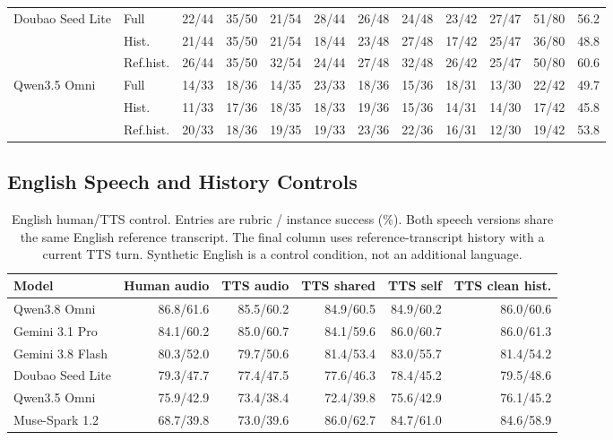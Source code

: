 \begin{table}[htbp]
\begin{tabular*}{\linewidth}{@{}l@{\hspace{5pt}}l@{\extracolsep{\fill}}*{9}{r}r@{}}
Doubao Seed Lite & Full & 22/44 & 35/50 & 21/54 & 28/44 & 26/48 & 24/48 & 23/42 & 27/47 & 51/80 & 56.2 \\
 & Hist. & 21/44 & 35/50 & 21/54 & 18/44 & 23/48 & 27/48 & 17/42 & 25/47 & 36/80 & 48.8 \\
 & Ref.hist. & 26/44 & 35/50 & 32/54 & 24/44 & 27/48 & 32/48 & 26/42 & 25/47 & 50/80 & 60.6 \\
Qwen3.5 Omni & Full & 14/33 & 18/36 & 14/35 & 23/33 & 18/36 & 15/36 & 18/31 & 13/30 & 22/42 & 49.7 \\
 & Hist. & 11/33 & 17/36 & 18/35 & 18/33 & 19/36 & 15/36 & 14/31 & 14/30 & 17/42 & 45.8 \\
 & Ref.hist. & 20/33 & 18/36 & 19/35 & 19/33 & 23/36 & 22/36 & 16/31 & 12/30 & 19/42 & 53.8 \\
\bottomrule
\end{tabular*}
\endgroup
\end{table}


\subsection{English Speech and History Controls}

\label{app:history_controls}

\begin{table}[htbp]
\centering
\caption{English human/TTS control. Entries are rubric / instance success (\%). Both speech versions share the same English reference transcript. The final column uses reference-transcript history with a current TTS turn. Synthetic English is a control condition, not an additional language.}
\label{tab:english_control}
\begingroup
\fontsize{8.5}{10.2}\selectfont
\setlength{\tabcolsep}{1pt}
\renewcommand{\arraystretch}{1.06}
\begin{tabular*}{\linewidth}{@{}l@{\extracolsep{\fill}}rrrrr@{}}
\toprule
\textbf{Model} & \textbf{Human audio} & \textbf{TTS audio} & \textbf{TTS shared} & \textbf{TTS self} & \textbf{TTS clean hist.} \\
\midrule
Qwen3.8 Omni & 86.8/61.6 & 85.5/60.2 & 84.9/60.5 & 84.9/60.2 & 86.0/60.6 \\
Gemini 3.1 Pro & 84.1/60.2 & 85.0/60.7 & 84.1/59.6 & 86.0/60.7 & 86.0/61.3 \\
Gemini 3.8 Flash & 80.3/52.0 & 79.7/50.6 & 81.4/53.4 & 83.0/55.7 & 81.4/54.2 \\
Doubao Seed Lite & 79.3/47.7 & 77.4/47.5 & 77.6/46.3 & 78.4/45.2 & 79.5/48.6 \\
Qwen3.5 Omni & 75.9/42.9 & 73.4/38.4 & 72.4/39.8 & 75.6/42.9 & 76.1/45.2 \\
Muse-Spark 1.2 & 68.7/39.8 & 73.0/39.6 & 86.0/62.7 & 84.7/61.0 & 84.6/58.9 \\
\bottomrule
\end{tabular*}
\endgroup
\end{table}


